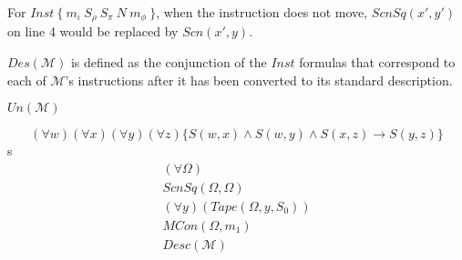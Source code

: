 \documentclass[11pt]{article}
\newcommand{\?}{\stackrel{?}{=}}
\begin{document}
For $Inst \ \{ \ m_\iota \ S_\rho \ S_\pi \ N \ m_\phi \ \}$, when the instruction does not move, $ScnSq(x',y')$ on line 4 would be replaced by $Scn(x',y)$.

$Des(\mathscr{M})$ is defined as the conjunction of the $Inst$ formulas that correspond to each of $\mathscr{M}$'s instructions after it has been converted to its standard description. 

$Un(\mathscr{M})$

$$(\forall w)(\forall x)(\forall y)(\forall z)\{S(w,x) \land S(w,y) \land S(x,z) \to S(y,z) \}$$
s
\begin{align}
(\forall \Omega) \\
ScnSq(\Omega, \Omega) \\
(\forall y)(Tape(\Omega, y, S_0)) \\
MCon(\Omega, m_1) \\
Desc(\mathscr{M})
\end{align}
\end{document}
